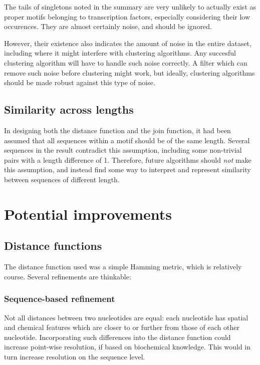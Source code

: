 \documentclass[fleqn]{book}
\begin{document}
The tails of singletons noted in the summary are very unlikely to
actually exist as proper motifs belonging to transcription factors,
especially considering their low occurences. They are almost certainly
noise, and should be ignored.

However, their existence also indicates the amount of noise in the
entire dataset, including where it might interfere with clustering
algorithms. Any succesful clustering algorithm will have to handle such
noise correctly. A filter which can remove such noise before clustering
might work, but ideally, clustering algorithms should be made robust
against this type of noise.

\subsection{Similarity across lengths}\label{similarity-across-lengths}

In designing both the distance function and the join function, it had
been assumed that all sequences within a motif should be of the same
length. Several sequences in the result contradict this assumption,
including some non-trivial pairs with a length difference of 1.
Therefore, future algorithms should \emph{not} make this assumption, and
instead find some way to interpret and represent similarity between
sequences of different length.

\section{Potential improvements}\label{potential-improvements}

\subsection{Distance functions}\label{distance-functions}

The distance function used was a simple Hamming metric, which is
relatively course. Several refinements are thinkable:

\subsubsection{Sequence-based
refinement}\label{sequence-based-refinement}

Not all distances between two nucleotides are equal: each nucleotide has
spatial and chemical features which are closer to or further from those
of each other nucleotide. Incorporating such differences into the
distance function could increase point-wise resolution, if based on
biochemical knowledge. This would in turn increase resolution on the
sequence level.
\end{document}
